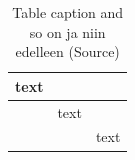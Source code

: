 
 \vspace{0.8cm} %
\begin{table}[h]
\caption{\label{tab:table-name}Table caption and so on ja niin edelleen (Source)}
\centering
\begin{tabular}{|l|l|l|}
\hline
text & & \\
\hline
 & text & \\
\hline
 & & text \\
\hline
\end{tabular}

\end{table}

